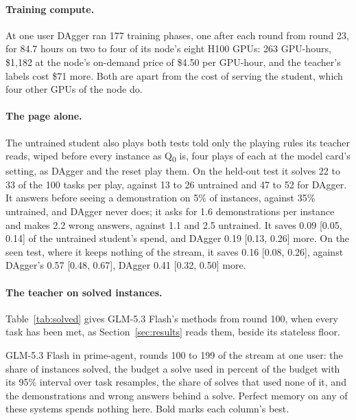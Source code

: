 \paragraph{Training compute.}
At one user DAgger ran 177 training phases, one after each round from round 23, for 84.7 hours on two to four of its node's eight H100 GPUs: 263 GPU-hours, \$1,182 at the node's on-demand price of \$4.50 per GPU-hour, and the teacher's labels cost \$71 more. Both are apart from the cost of serving the student, which four other GPUs of the node do.

\paragraph{The page alone.}
\label{app:told}
The untrained student also plays both tests told only the playing rules its teacher reads, wiped before every instance as Q\textsubscript{0} is, four plays of each at the model card's setting, as DAgger and the reset play them. On the held-out test it solves 22 to 33 of the 100 tasks per play, against 13 to 26 untrained and 47 to 52 for DAgger. It answers before seeing a demonstration on 5\% of instances, against 35\% untrained, and DAgger never does; it asks for 1.6 demonstrations per instance and makes 2.2 wrong answers, against 1.1 and 2.5 untrained. It saves 0.09 [0.05, 0.14] of the untrained student's spend, and DAgger 0.19 [0.13, 0.26] more. On the seen test, where it keeps nothing of the stream, it saves 0.16 [0.08, 0.26], against DAgger's 0.57 [0.48, 0.67], DAgger 0.41 [0.32, 0.50] more.

\paragraph{The teacher on solved instances.}
Table~\ref{tab:solved} gives GLM-5.3 Flash's methods from round 100, when every task has been met, as Section~\ref{sec:results} reads them, beside its stateless floor.

\begin{table}[htbp]
\centering
\footnotesize\setlength{\tabcolsep}{3pt}
\begin{adjustbox}{max width=\linewidth}

\end{adjustbox}
\caption{GLM-5.3 Flash in prime-agent, rounds 100 to 199 of the stream at one user: the share of instances solved, the budget a solve used in percent of the budget with its 95\% interval over task resamples, the share of solves that used none of it, and the demonstrations and wrong answers behind a solve. Perfect memory on any of these systems spends nothing here. Bold marks each column's best.}
\label{tab:solved}
\end{table}

